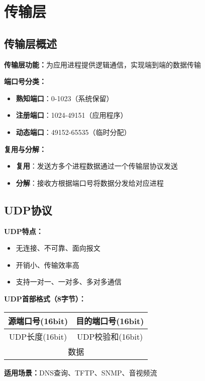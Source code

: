 \documentclass[lang=cn,newtx,10pt,scheme=chinese]{../../elegantbook}
\begin{document}
\chapter{传输层}

\section{传输层概述}

\textbf{传输层功能：}为应用进程提供逻辑通信，实现端到端的数据传输

\textbf{端口号分类：}
\begin{itemize}
  \item \textbf{熟知端口}：0-1023（系统保留）
  \item \textbf{注册端口}：1024-49151（应用程序）
  \item \textbf{动态端口}：49152-65535（临时分配）
\end{itemize}

\textbf{复用与分解：}
\begin{itemize}
  \item \textbf{复用}：发送方多个进程数据通过一个传输层协议发送
  \item \textbf{分解}：接收方根据端口号将数据分发给对应进程
\end{itemize}

\section{UDP协议}

\textbf{UDP特点：}
\begin{itemize}
  \item 无连接、不可靠、面向报文
  \item 开销小、传输效率高
  \item 支持一对一、一对多、多对多通信
\end{itemize}

\textbf{UDP首部格式（8字节）：}
\begin{center}
\begin{tabular}{|c|c|}
\hline
源端口号(16bit) & 目的端口号(16bit) \\
\hline
UDP长度(16bit) & UDP校验和(16bit) \\
\hline
\multicolumn{2}{|c|}{数据} \\
\hline
\end{tabular}
\end{center}

\textbf{适用场景：}DNS查询、TFTP、SNMP、音视频流
\end{document}

